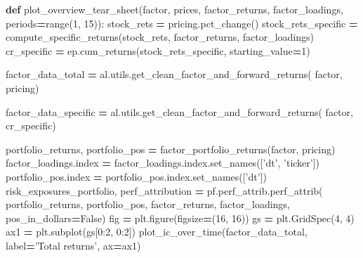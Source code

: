 \documentclass[11,]{article}
\newenvironment{Shaded}{\begin{snugshade}}{\end{snugshade}}
\newcommand{\BuiltInTok}[1]{#1}
\newcommand{\DecValTok}[1]{\textcolor[rgb]{0.00,0.00,0.81}{#1}}
\newcommand{\KeywordTok}[1]{\textcolor[rgb]{0.13,0.29,0.53}{\textbf{#1}}}
\newcommand{\NormalTok}[1]{#1}
\newcommand{\OperatorTok}[1]{\textcolor[rgb]{0.81,0.36,0.00}{\textbf{#1}}}
\newcommand{\StringTok}[1]{\textcolor[rgb]{0.31,0.60,0.02}{#1}}
\newcommand{\VariableTok}[1]{\textcolor[rgb]{0.00,0.00,0.00}{#1}}
\begin{document}
\begin{Shaded}
\begin{Highlighting}[]
\KeywordTok{def}\NormalTok{ plot_overview_tear_sheet(factor, prices, factor_returns, factor_loadings, periods}\OperatorTok{=}\BuiltInTok{range}\NormalTok{(}\DecValTok{1}\NormalTok{, }\DecValTok{15}\NormalTok{)):}
\NormalTok{    stock_rets }\OperatorTok{=}\NormalTok{ pricing.pct_change()}
\NormalTok{    stock_rets_specific }\OperatorTok{=}\NormalTok{ compute_specific_returns(stock_rets, factor_returns, factor_loadings)}
\NormalTok{    cr_specific }\OperatorTok{=}\NormalTok{ ep.cum_returns(stock_rets_specific, starting_value}\OperatorTok{=}\DecValTok{1}\NormalTok{)}
    
\NormalTok{    factor_data_total }\OperatorTok{=}\NormalTok{ al.utils.get_clean_factor_and_forward_returns(}
\NormalTok{        factor, }
\NormalTok{        pricing)}
    
\NormalTok{    factor_data_specific }\OperatorTok{=}\NormalTok{ al.utils.get_clean_factor_and_forward_returns(}
\NormalTok{        factor, }
\NormalTok{        cr_specific)}
    
\NormalTok{    portfolio_returns, portfolio_pos }\OperatorTok{=}\NormalTok{ factor_portfolio_returns(factor, pricing)}
\NormalTok{    factor_loadings.index }\OperatorTok{=}\NormalTok{ factor_loadings.index.set_names([}\StringTok{'dt'}\NormalTok{, }\StringTok{'ticker'}\NormalTok{])}
\NormalTok{    portfolio_pos.index }\OperatorTok{=}\NormalTok{ portfolio_pos.index.set_names([}\StringTok{'dt'}\NormalTok{])}
\NormalTok{    risk_exposures_portfolio, perf_attribution }\OperatorTok{=}\NormalTok{ pf.perf_attrib.perf_attrib(}
\NormalTok{        portfolio_returns, }
\NormalTok{        portfolio_pos, }
\NormalTok{        factor_returns, }
\NormalTok{        factor_loadings, }
\NormalTok{        pos_in_dollars}\OperatorTok{=}\VariableTok{False}\NormalTok{)}
\NormalTok{    fig }\OperatorTok{=}\NormalTok{ plt.figure(figsize}\OperatorTok{=}\NormalTok{(}\DecValTok{16}\NormalTok{, }\DecValTok{16}\NormalTok{))}
\NormalTok{    gs }\OperatorTok{=}\NormalTok{ plt.GridSpec(}\DecValTok{4}\NormalTok{, }\DecValTok{4}\NormalTok{)}
\NormalTok{    ax1 }\OperatorTok{=}\NormalTok{ plt.subplot(gs[}\DecValTok{0}\NormalTok{:}\DecValTok{2}\NormalTok{, }\DecValTok{0}\NormalTok{:}\DecValTok{2}\NormalTok{])}
\NormalTok{    plot_ic_over_time(factor_data_total, label}\OperatorTok{=}\StringTok{'Total returns'}\NormalTok{, ax}\OperatorTok{=}\NormalTok{ax1)}
 

\end{Highlighting}
\end{Shaded}
\end{document}

